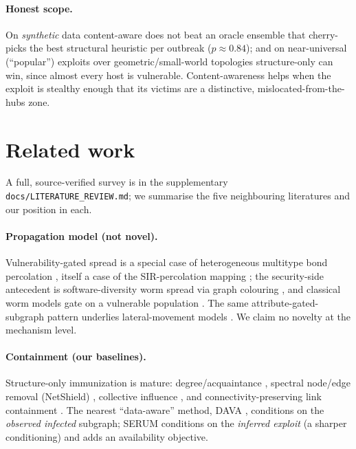 \documentclass[11pt]{article}
\begin{document}
\paragraph{Honest scope.} On \emph{synthetic} data content-aware does not beat an
oracle ensemble that cherry-picks the best structural heuristic per outbreak
($p\approx0.84$); and on near-universal (``popular'') exploits over
geometric/small-world topologies structure-only can win, since almost every host
is vulnerable. Content-awareness helps when the exploit is stealthy enough that
its victims are a distinctive, mislocated-from-the-hubs zone.

\section{Related work}
A full, source-verified survey is in the supplementary \texttt{docs/LITERATURE\_REVIEW.md};
we summarise the five neighbouring literatures and our position in each.

\paragraph{Propagation model (not novel).} Vulnerability-gated spread is a
special case of heterogeneous multitype bond percolation
\citep{allard2009multitype}, itself a case of the SIR-percolation mapping
\citep{newman2002spread}; the security-side antecedent is software-diversity
worm spread via graph colouring \citep{odonnell2004diversity}, and classical
worm models gate on a vulnerable population \citep{staniford2002own,chen2003aawp}.
The same attribute-gated-subgraph pattern underlies lateral-movement models
\citep{powell2019lateral}. We claim no novelty at the mechanism level.

\paragraph{Containment (our baselines).} Structure-only immunization is mature:
degree/acquaintance \citep{pastorsatorras2002immunization,cohen2003acquaintance},
spectral node/edge removal (NetShield) \citep{chen2016netshield}, collective
influence \citep{morone2015influence}, and connectivity-preserving link
containment \citep{matamalas2018containment}. The nearest ``data-aware'' method,
DAVA \citep{zhang2015dava}, conditions on the \emph{observed infected} subgraph;
SERUM conditions on the \emph{inferred exploit} (a sharper conditioning) and adds
an availability objective.
\end{document}
